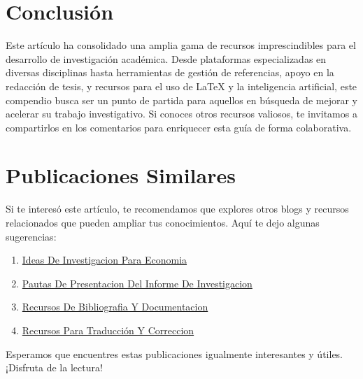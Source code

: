 \documentclass[
  jou,
  floatsintext,
  longtable,
  a4paper,
  nolmodern,
  notxfonts,
  notimes,
  colorlinks=true,linkcolor=blue,citecolor=blue,urlcolor=blue]{apa7}
\providecommand{\tightlist}{%
  \setlength{\itemsep}{0pt}\setlength{\parskip}{0pt}}
\begin{document}
\section{Conclusión}\label{conclusiuxf3n}

Este artículo ha consolidado una amplia gama de recursos imprescindibles
para el desarrollo de investigación académica. Desde plataformas
especializadas en diversas disciplinas hasta herramientas de gestión de
referencias, apoyo en la redacción de tesis, y recursos para el uso de
LaTeX y la inteligencia artificial, este compendio busca ser un punto de
partida para aquellos en búsqueda de mejorar y acelerar su trabajo
investigativo. Si conoces otros recursos valiosos, te invitamos a
compartirlos en los comentarios para enriquecer esta guía de forma
colaborativa.

\section{Publicaciones Similares}\label{publicaciones-similares}

Si te interesó este artículo, te recomendamos que explores otros blogs y
recursos relacionados que pueden ampliar tus conocimientos. Aquí te dejo
algunas sugerencias:

\begin{enumerate}
\def\labelenumi{\arabic{enumi}.}
\tightlist
\item
  \href{https://achalmaedison.netlify.app/investigacion-metodologia/posts/2023-06-03-ideas-de-investigacion-para-economia/index.pdf}{}
  \href{https://achalmaedison.netlify.app/investigacion-metodologia/posts/2023-06-03-ideas-de-investigacion-para-economia}{Ideas
  De Investigacion Para Economia}
\item
  \href{https://achalmaedison.netlify.app/investigacion-metodologia/posts/2023-06-03-pautas-de-presentacion-del-informe-de-investigacion/index.pdf}{}
  \href{https://achalmaedison.netlify.app/investigacion-metodologia/posts/2023-06-03-pautas-de-presentacion-del-informe-de-investigacion}{Pautas
  De Presentacion Del Informe De Investigacion}
\item
  \href{https://achalmaedison.netlify.app/investigacion-metodologia/posts/2025-01-12-recursos-de-bibliografia-y-documentacion/index.pdf}{}
  \href{https://achalmaedison.netlify.app/investigacion-metodologia/posts/2025-01-12-recursos-de-bibliografia-y-documentacion}{Recursos
  De Bibliografia Y Documentacion}
\item
  \href{https://achalmaedison.netlify.app/investigacion-metodologia/posts/2025-02-09-recursos-para-traducción-y-correccion/index.pdf}{}
  \href{https://achalmaedison.netlify.app/investigacion-metodologia/posts/2025-02-09-recursos-para-traducción-y-correccion}{Recursos
  Para Traducción Y Correccion}
\end{enumerate}

Esperamos que encuentres estas publicaciones igualmente interesantes y
útiles. ¡Disfruta de la lectura!
\end{document}
